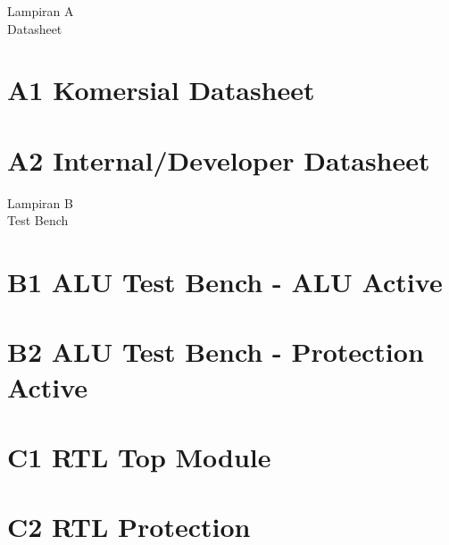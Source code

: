 % 

\begin{titlepage}
	\centering 
	\vspace*{9cm}
	\noindent \Huge{Lampiran A \\ Datasheet}

\end{titlepage}
\chapter*{\vspace*{9cm} A1  Komersial Datasheet}
\chapter*{\vspace*{9cm} A2 Internal/Developer Datasheet}

\begin{titlepage}
	\centering 
	\vspace*{9cm}
	\noindent \Huge{Lampiran B \\ Test Bench}
\end{titlepage}
\chapter*{\vspace*{9cm} B1 ALU Test Bench - ALU Active}

\chapter*{\vspace*{9cm} B2 ALU Test Bench - Protection Active}


\begin{titlepage}
	\centering 
	\vspace*{9cm}
	\noindent \Huge{Lampiran C \\ RTL Design
\end{titlepage}

\chapter*{\vspace*{9cm} C1 RTL Top Module}

\chapter*{\vspace*{9cm} C2 RTL Protection}

